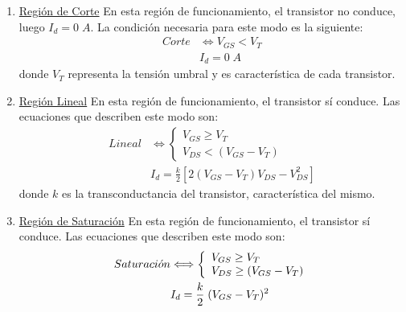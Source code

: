 \begin{enumerate}
    \item \underline{Región de Corte}
    En esta región de funcionamiento, el transistor no conduce, luego $I_d = 0\;A$. La condición necesaria para este modo es la siguiente:
    \begin{equation}\begin{split}
        Corte & \Longleftrightarrow V_{GS} < V_T \\
        & I_d = 0\;A
    \end{split}\end{equation}
    donde $V_T$ representa la tensión umbral y es característica de cada transistor.
    
    \item \underline{Región Lineal}
    En esta región de funcionamiento, el transistor sí conduce. Las ecuaciones que describen este modo son:
    \begin{equation}\begin{split}
        Lineal & \Longleftrightarrow \left\{ 
            \begin{array}{l}
                 V_{GS} \geq V_T  \\
                 V_{DS} < (V_{GS} - V_T)
            \end{array}
        \right. \\
        & I_d = \frac{k}{2} \left[ 2(V_{GS} - V_T)V_{DS} - V_{DS}^2 \right]
    \end{split}\end{equation}
    donde $k$ es la transconductancia del transistor, característica del mismo.
    
    \item \underline{Región de Saturación}
    En esta región de funcionamiento, el transistor sí conduce. Las ecuaciones que describen este modo son:
    \begin{equation}\label{Ec:Sat}
    \begin{split}
        Saturaci\Acute{o}n & \Longleftrightarrow \left\{ 
            \begin{array}{l}
                 V_{GS} \geq V_T  \\
                 V_{DS} \geq (V_{GS} - V_T)
            \end{array}
        \right. \\
        & I_d = \frac{k}{2} \;(V_{GS} - V_T)^2
    \end{split}\end{equation}
    
\end{enumerate}

